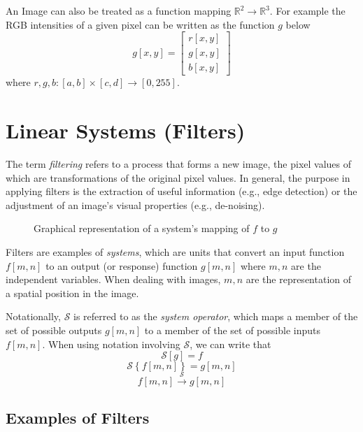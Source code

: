 \documentclass{article}
\begin{document}
An Image can also be treated as a function mapping $\mathbb{R}^{2} \to \mathbb{R}^3$. For example the RGB intensities of a given pixel can be written as the function $g$ below
\[
	g[x, y] = \begin{bmatrix} r[x, y] \\ g[x, y] \\ b[x, y] \end{bmatrix} \tag{Color Pixel Intensity}
\]
where $r, g, b: [a, b] \times [c, d] \to [0, 255]$.

\section{Linear Systems (Filters)}

The term \emph{filtering} refers to a process that forms a new image, the pixel values of which are transformations of the original pixel values. In general, the purpose in applying filters is the extraction of useful information (e.g., edge detection) or the adjustment of an image's visual properties (e.g., de-noising).

\begin{figure}
\begin{center}
\end{center}
\caption{Graphical representation of a system's mapping of $f$ to $g$}
\end{figure}

Filters are examples of \emph{systems}, which are units that convert an input function $f[m, n]$ to an output (or response) function $g[m, n]$ where $m, n$ are the independent variables. When dealing with images, $m, n$ are the representation of a spatial position in the image.

Notationally, $\mathcal{S}$ is referred to as the \emph{system operator}, which maps a member of the set of possible outputs $g[m, n]$ to a member of the set of possible inputs $f[m, n]$. When using notation involving $\mathcal{S}$, we can write that
\[
\mathcal{S}[g] = f
\]
\[
	\mathcal{S}\left\{f[m, n]\right\} = g[m, n]
\]
\[
	f[m, n] \xrightarrow{\mathcal{S}} g[m, n]
\]

\subsection{Examples of Filters}
\end{document}
